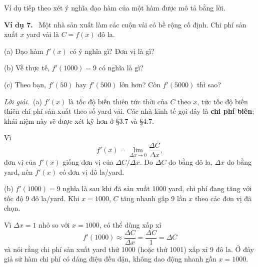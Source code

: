 \documentclass[12pt,a4paper]{article}
\newcommand{\ex}[1]{\par\medskip\noindent\textbf{Ví dụ #1.}\ }
\newcommand{\sol}{\par\nopagebreak[4]\noindent\textit{Lời giải.}\ }
\begin{document}
Ví dụ tiếp theo xét ý nghĩa đạo hàm của một hàm được mô tả bằng lời.
\ex{7} Một nhà sản xuất làm các cuộn vải có bề rộng cố định. Chi phí sản xuất $x$ yard vải là $C=f(x)$ đô la.

(a) Đạo hàm $f'(x)$ có ý nghĩa gì? Đơn vị là gì?

(b) Về thực tế, $f'(1000)=9$ có nghĩa là gì?

(c) Theo bạn, $f'(50)$ hay $f'(500)$ lớn hơn? Còn $f'(5000)$ thì sao?
\sol (a) $f'(x)$ là tốc độ biến thiên tức thời của $C$ theo $x$, tức tốc độ biến thiên chi phí sản xuất theo số yard vải. Các nhà kinh tế gọi đây là \textbf{chi phí biên}; khái niệm này sẽ được xét kỹ hơn ở §3.7 và §4.7.

Vì
\[f'(x)=\lim_{\Delta x\to0}\frac{\Delta C}{\Delta x},\]
đơn vị của $f'(x)$ giống đơn vị của $\Delta C/\Delta x$. Do $\Delta C$ đo bằng đô la, $\Delta x$ đo bằng yard, nên $f'(x)$ có đơn vị đô la/yard.

(b) $f'(1000)=9$ nghĩa là sau khi đã sản xuất 1000 yard, chi phí đang tăng với tốc độ 9 đô la/yard. Khi $x=1000$, $C$ tăng nhanh gấp 9 lần $x$ theo các đơn vị đã chọn.

Vì $\Delta x=1$ nhỏ so với $x=1000$, có thể dùng xấp xỉ
\[f'(1000)\approx\frac{\Delta C}{\Delta x}=\frac{\Delta C}{1}=\Delta C\]
và nói rằng chi phí sản xuất yard thứ 1000 (hoặc thứ 1001) xấp xỉ 9 đô la. Ở đây giả sử hàm chi phí có dáng điệu đều đặn, không dao động nhanh gần $x=1000$.
\end{document}
